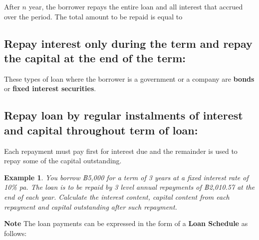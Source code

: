 \documentclass[landscape, 20pt]{extreport}
\theoremstyle{definition}
\theoremstyle{definition}
\newtheorem{example}{Example}[chapter]
\theoremstyle{definition}
\theoremstyle{definition}
\theoremstyle{remark}
\begin{document}
After \(n\) year, the borrower repays the entire loan and all interest
that accrued over the period. The total amount to be repaid is equal to

\newpage \hypertarget{repay-interest-only-during-the-term-and-repay-the-capital-at-the-end-of-the-term}{%
\subsection*{Repay interest only during the term and repay the capital at the end of the term:}\label{repay-interest-only-during-the-term-and-repay-the-capital-at-the-end-of-the-term}}

These types of loan where the borrower is a government or a company are
\textbf{bonds} or \textbf{fixed interest securities}.

\newpage \hypertarget{repay-loan-by-regular-instalments-of-interest-and-capital-throughout-term-of-loan}{%
\subsection*{Repay loan by regular instalments of interest and capital throughout term of loan:}\label{repay-loan-by-regular-instalments-of-interest-and-capital-throughout-term-of-loan}}

Each repayment must pay first for interest due and the remainder is used
to repay some of the capital outstanding.

\newpage \begin{example}
\emph{You borrow ฿5,000 for a term of 3 years at a fixed interest rate of 10\%
pa. The loan is to be repaid by 3 level annual repayments of ฿2,010.57
at the end of each year. Calculate the interest content, capital content
from each repayment and capital outstanding after such repayment.}
\end{example}

\textbf{Note} The loan payments can be expressed in the form of a \textbf{Loan
Schedule} as follows:
\end{document}
